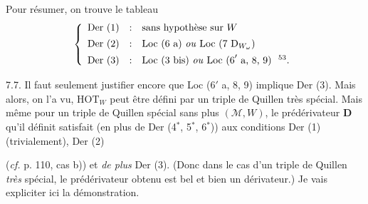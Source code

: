 Pour résumer, on trouve le tableau
\[
\left\{
\begin{array}{lcl}
\text{Der (1)} & : & \text{sans hypothèse sur } W \\[1ex]
\text{Der (2)} & : & \text{Loc (6 a) \textit{ou} Loc (7 }\mathrm{D}_{W_\omega}\text{)} \\[1ex]
\text{Der (3)} & : & \text{Loc (3 bis) \textit{ou} Loc (6}'\text{ a, 8, 9)\ \ \footnotemark[53].}
\end{array}
\right.
\]

7.7. Il faut seulement justifier encore que Loc (6$'$ a, 8, 9) implique Der (3). Mais alors, on l'a vu, $\mathrm{HOT}_W$ peut être défini par un triple de Quillen très spécial. Mais même pour un triple de Quillen spécial sans plus $(\mathcal{M},W)$, le prédérivateur $\mathbf{D}$ qu'il définit satisfait (en plus de Der (4$^*$, 5$^*$, 6$^*$)) aux conditions Der (1) (trivialement), Der (2)

(\textit{cf.} p. 110, cas b)) et \textit{de plus} Der (3). (Donc dans le cas d'un triple de Quillen \textit{très} spécial, le prédérivateur obtenu est bel et bien un dérivateur.) Je vais expliciter ici la démonstration.

